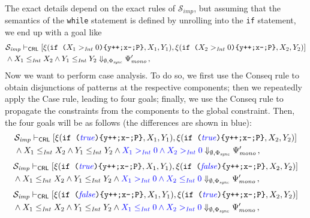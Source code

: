 The exact details depend on the exact rules of $\mathcal{S}_{\mathit{imp}}$, but assuming that the semantics of
the \texttt{while} statement is defined by unrolling into the \texttt{if} statement,
we end up with a goal like
\begin{align*}
  & \mathcal{S}_{\mathit{imp}} \vdash_{\mathsf{CRL}}
  [ \xi(\texttt{if (}X_1 >_{\mathit{Int}} 0 \texttt{)\{y++;x--;P\}}, X_1, Y_1),  
    \xi(\texttt{if (}X_2 >_{\mathit{Int}} 0 \texttt{)\{y++;x--;P\}}, X_2, Y_2) ] \\
  & \land X_1 \leq_{\mathit{Int}} X_2 \land Y_1 \leq_{\mathit{Int}} Y_2
  \Downarrow_{\emptyset, \Phi_{\mathit{sync}}} \Psi^\prime_{\mathit{mono}} \, ,
\end{align*}
Now we want to perform case analysis. To do so, we first use the Conseq rule to
obtain disjunctions of patterns at the respective components;
then we repeatedly apply the Case rule, leading to four goals;
finally, we use the Conseq rule to propagate the constraints from the components to the global constraint.
Then, the four goals will be as follows
(the differences are shown in {\color{blue}blue}):
\begin{equation}\label{ex:case1}
\begin{aligned}
  & \mathcal{S}_{\mathit{imp}} \vdash_{\mathsf{CRL}}
  [ \xi(\texttt{if (}{\color{blue}\mathit{true}}\texttt{)\{y++;x--;P\}}, X_1, Y_1),  
    \xi(\texttt{if (}{\color{blue}\mathit{true}}\texttt{)\{y++;x--;P\}}, X_2, Y_2) ] \\
  & \land X_1 \leq_{\mathit{Int}} X_2 \land Y_1 \leq_{\mathit{Int}} Y_2 \land {\color{blue} X_1 >_{\mathit{Int}} 0 \land X_2 >_{\mathit{Int}} 0 }
  \Downarrow_{\emptyset, \Phi_{\mathit{sync}}} \Psi^\prime_{\mathit{mono}} \, ,
\end{aligned}
\end{equation}
\begin{equation}\label{ex:case2}
\begin{aligned}
  & \mathcal{S}_{\mathit{imp}} \vdash_{\mathsf{CRL}}
  [ \xi(\texttt{if (}{\color{blue}\mathit{true}}\texttt{)\{y++;x--;P\}}, X_1, Y_1),  
    \xi(\texttt{if (}{\color{blue}\mathit{false}}\texttt{)\{y++;x--;P\}}, X_2, Y_2) ] \\
  & \land X_1 \leq_{\mathit{Int}} X_2 \land Y_1 \leq_{\mathit{Int}} Y_2 \land {\color{blue} X_1 >_{\mathit{Int}} 0 \land X_2 \leq_{\mathit{Int}} 0 }
  \Downarrow_{\emptyset, \Phi_{\mathit{sync}}} \Psi^\prime_{\mathit{mono}} \, ,
\end{aligned}
\end{equation}
\begin{equation}\label{ex:case3}
\begin{aligned}
  & \mathcal{S}_{\mathit{imp}} \vdash_{\mathsf{CRL}}
  [ \xi(\texttt{if (}{\color{blue}\mathit{false}}\texttt{)\{y++;x--;P\}}, X_1, Y_1),  
    \xi(\texttt{if (}{\color{blue}\mathit{true}}\texttt{)\{y++;x--;P\}}, X_2, Y_2) ] \\
  & \land X_1 \leq_{\mathit{Int}} X_2 \land Y_1 \leq_{\mathit{Int}} Y_2 \land {\color{blue} X_1 \leq_{\mathit{Int}} 0 \land X_2 >_{\mathit{Int}} 0 }
  \Downarrow_{\emptyset, \Phi_{\mathit{sync}}} \Psi^\prime_{\mathit{mono}} \, ,
\end{aligned}
\end{equation}
